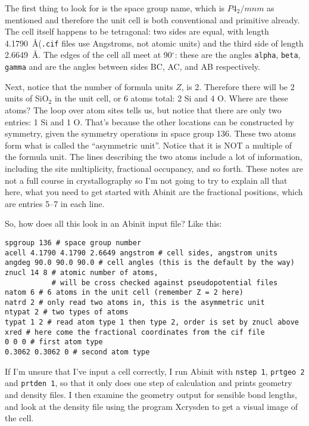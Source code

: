 \documentclass{article}
\begin{document}
The first thing to look for is the space group name, which is $P4_2/mnm$ as mentioned and therefore the unit cell
is both conventional and primitive already. The cell itself happens to be tetragonal: two sides are equal,
with length 4.1790~\AA ({\tt .cif} files use Angstroms, not atomic units) and the third side of length 2.6649~\AA.
The edges of the cell all meet at 90$^\circ$: these are the angles {\tt alpha}, {\tt beta}, {\tt gamma} and
are the angles between sides BC, AC, and AB respectively.

Next, notice that the number of formula units $Z$, is 2. Therefore there will be 2 units of SiO$_2$ in the unit cell,
or 6 atoms total: 2 Si and 4 O. Where are these atoms? The loop over atom sites tells us, but notice that
there are only two entries: 1 Si and 1 O. That's because the other locations can be constructed by symmetry, given
the symmetry operations in space group 136. These two atoms form what is called the ``asymmetric unit''. Notice
that it is NOT a multiple of the formula unit. The lines describing the two atoms include a lot of information,
including the site multiplicity, fractional occupancy, and so forth. These notes are not a full course in
crystallography so I'm not going to try to explain all that here, what you need to get started with {\sc Abinit}
are the fractional positions, which are entries 5--7 in  each line.

So, how does all this look in an {\sc Abinit} input file? Like this:
\begin{verbatim}
spgroup 136 # space group number
acell 4.1790 4.1790 2.6649 angstrom # cell sides, angstrom units
angdeg 90.0 90.0 90.0 # cell angles (this is the default by the way)
znucl 14 8 # atomic number of atoms,
           # will be cross checked against pseudopotential files
natom 6 # 6 atoms in the unit cell (remember Z = 2 here)
natrd 2 # only read two atoms in, this is the asymmetric unit
ntypat 2 # two types of atoms
typat 1 2 # read atom type 1 then type 2, order is set by znucl above
xred # here come the fractional coordinates from the cif file
0 0 0 # first atom type
0.3062 0.3062 0 # second atom type
\end{verbatim}

If I'm unsure that I've input a cell correctly, I run {\sc Abinit} with {\tt nstep 1}, {\tt prtgeo 2} and
{\tt prtden 1}, so that
it only does one step of calculation and prints  geometry and density files. I then examine the
geometry output for sensible bond lengths, and look at the density file using the program {\sc Xcrysden}
to get a visual image of the cell.
\end{document}
